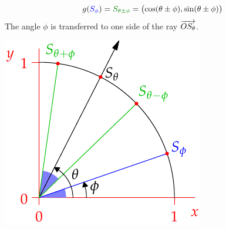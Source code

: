 \begin{enumerate}
\begin{minipage}[t]{0.64\linewidth}
		\[
			g(\textcolor{blue}{S_\phi})=\textcolor{Green}{S_{\theta\pm\phi}} =\bigl(\cos(\theta\pm\phi),\sin(\theta\pm\phi)\bigr)
		\]
		The angle $\phi$ is transferred to one side of the ray $\overrightarrow{OS_\theta}$.
	\end{minipage}
	\hfill
	\begin{minipage}[t]{0.34\linewidth}\vspace{0pt}
		\flushright\includegraphics[scale=0.95]{isom-rot2}
	\end{minipage}
\end{enumerate}

